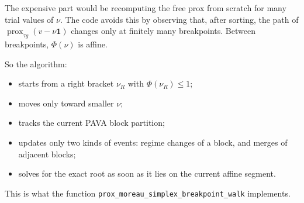 \documentclass[11pt]{article}
\begin{document}
The expensive part would be recomputing the free prox from scratch for many
trial values of \(\nu\). The code avoids this by observing that, after sorting,
the path of \(\operatorname{prox}_{\tau g}(v - \nu \mathbf{1})\) changes only
at finitely many breakpoints. Between breakpoints, \(\Phi(\nu)\) is affine.

So the algorithm:
\begin{itemize}[topsep=0.3em,itemsep=0.2em]
\item starts from a right bracket \(\nu_R\) with \(\Phi(\nu_R) \le 1\);
\item moves only toward smaller \(\nu\);
\item tracks the current PAVA block partition;
\item updates only two kinds of events: regime changes of a block, and merges
of adjacent blocks;
\item solves for the exact root as soon as it lies on the current affine
  segment.
\end{itemize}

This is what the function
\texttt{prox\_moreau\_simplex\_breakpoint\_walk} implements.
\end{document}

